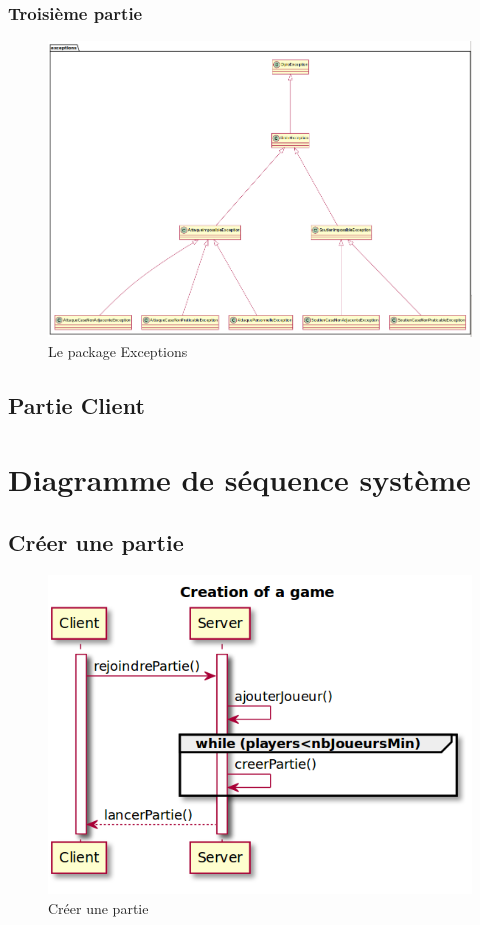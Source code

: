 		\subsubsection{Troisième partie}
			\vspace{10mm}
			\begin{figure}[!h]
				\centering
				\includegraphics[scale=0.4]{images/DP3.png}
				\caption{Le package Exceptions}
			\end{figure}
		\newpage
	\subsection{Partie Client}
\section{Diagramme de séquence système}
	\subsection{Créer une partie}
		\vspace{10mm}
		\begin{figure}[!h]
			\centering
			\includegraphics[scale=0.5]{images/DSSCreate.png}
			\caption{Créer une partie}
		\end{figure}


